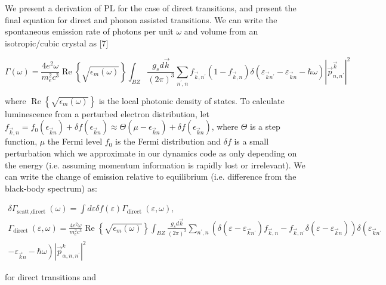 \documentclass[10pt]{article}
\begin{document}
We present a derivation of PL for the case of direct transitions, and present the final equation for direct and phonon assisted transitions. We can write the spontaneous emission rate of photons per unit $\omega$ and volume from an isotropic/cubic crystal as [7]


\begin{equation*}
\Gamma(\omega)=\frac{4 e^{2} \omega}{m_{e}^{2} c^{3}} \operatorname{Re}\left\{\sqrt{\epsilon_{m}(\omega)}\right\} \int_{B Z} \frac{g_{s} d \vec{k}}{(2 \pi)^{3}} \sum_{n^{\prime}, n} f_{\vec{k}, n^{\prime}}\left(1-f_{\vec{k}, n}\right) \delta\left(\varepsilon_{\vec{k} n^{\prime}}-\varepsilon_{\vec{k} n}-\hbar \omega\right)\left|\vec{p}_{n, n^{\prime}}^{\vec{k}}\right|^{2} \tag{S7}
\end{equation*}


where $\operatorname{Re}\left\{\sqrt{\epsilon_{m}(\omega)}\right\}$ is the local photonic density of states. To calculate luminescence from a perturbed electron distribution, let $f_{\vec{k}, n}=f_{0}\left(\epsilon_{\vec{k} n}\right)+\delta f\left(\epsilon_{\vec{k} n}\right) \approx \Theta\left(\mu-\epsilon_{\vec{k} n}\right)+\delta f\left(\epsilon_{\vec{k} n}\right)$, where $\Theta$ is a step\\
function, $\mu$ the Fermi level $f_{0}$ is the Fermi distribution and $\delta f$ is a small perturbation which we approximate in our dynamics code as only depending on the energy (i.e. assuming momentum information is rapidly lost or irrelevant). We can write the change of emission relative to equilibrium (i.e. difference from the black-body spectrum) as:

$$
\begin{gathered}
\delta \Gamma_{\text {scatt,direct }}(\omega)=\int d \varepsilon \delta f(\varepsilon) \Gamma_{\text {direct }}(\varepsilon, \omega), \\
\Gamma_{\text {direct }}(\varepsilon, \omega)=\frac{4 e^{2} \omega}{m_{e}^{2} c^{3}} \operatorname{Re}\left\{\sqrt{\epsilon_{m}(\omega)}\right\} \int_{B Z} \frac{g_{s} d \vec{k}}{(2 \pi)^{3}} \sum_{n^{\prime}, n}\left(\delta\left(\varepsilon-\varepsilon_{\vec{k} n^{\prime}}\right) f_{\vec{k}, n}-f_{\vec{k}, n^{\prime}} \delta\left(\varepsilon-\varepsilon_{\vec{k} n}\right)\right) \delta\left(\varepsilon_{\vec{k} n^{\prime}}\right. \\
\left.-\varepsilon_{\vec{k} n}-\hbar \omega\right)\left|\vec{p}_{\alpha, n, n^{\prime}}^{k}\right|^{2}
\end{gathered}
$$

for direct transitions and
\end{document}
